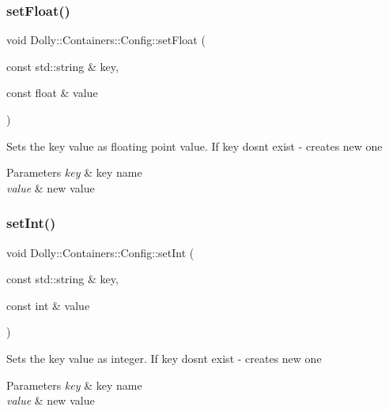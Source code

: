 \subsubsection{\texorpdfstring{set\+Float()}{setFloat()}}
{\footnotesize\ttfamily void Dolly\+::\+Containers\+::\+Config\+::set\+Float (\begin{DoxyParamCaption}\item[{const std\+::string \&}]{key,  }\item[{const float \&}]{value }\end{DoxyParamCaption})}

Sets the key value as floating point value. If key dosn\textquotesingle{}t exist -\/ creates new one 
\begin{DoxyParams}{Parameters}
{\em key} & key name \\
\hline
{\em value} & new value \\
\hline
\end{DoxyParams}
\mbox{\label{class_dolly_1_1_containers_1_1_config_a11a53fcd254b554a59e2e7e8d12ed323}} 
\subsubsection{\texorpdfstring{set\+Int()}{setInt()}}
{\footnotesize\ttfamily void Dolly\+::\+Containers\+::\+Config\+::set\+Int (\begin{DoxyParamCaption}\item[{const std\+::string \&}]{key,  }\item[{const int \&}]{value }\end{DoxyParamCaption})}

Sets the key value as integer. If key dosn\textquotesingle{}t exist -\/ creates new one 
\begin{DoxyParams}{Parameters}
{\em key} & key name \\
\hline
{\em value} & new value \\
\hline
\end{DoxyParams}
\mbox{\label{class_dolly_1_1_containers_1_1_config_a22ee3849c2bab24160b27601864c9270}} 
